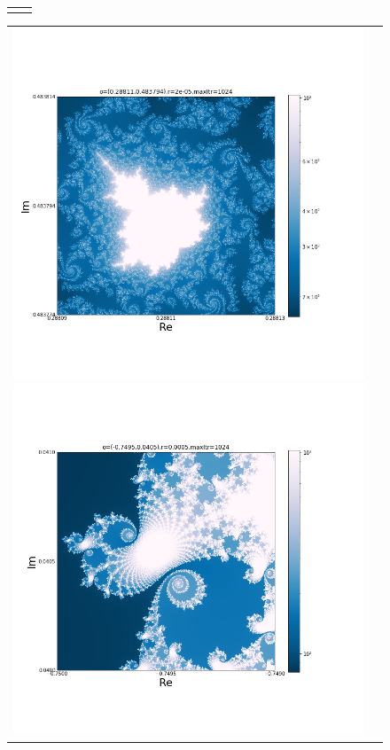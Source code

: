 \documentclass[uplatex,a4paper,11pt,oneside,openany]{jsbook}
\begin{document}
\begin{figure}[H]
\begin{tabular}{cc}
\begin{minipage}{0.5\hsize}
      \end{minipage}
    \end{tabular}
\end{figure}%

\begin{figure}[H]
  \centering
    \begin{tabular}{cc}
      \begin{minipage}{0.5\hsize}
        \centering
  \includegraphics[bb=15 100 650 600,keepaspectratio,clip,scale=0.35]{../src/figure/mandel009.png}
      \end{minipage}
      \begin{minipage}{0.5\hsize}
        \centering
  \includegraphics[bb=15 100 650 600,keepaspectratio,clip,scale=0.35]{../src/figure/mandel010.png}

\end{minipage}
\end{tabular}
\end{figure}
\end{document}

